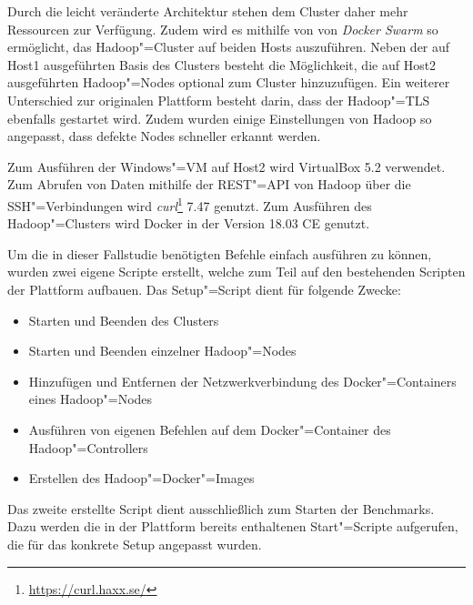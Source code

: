 Durch die leicht veränderte Architektur stehen dem Cluster daher mehr Ressourcen zur Verfügung.
Zudem wird es mithilfe von von \emph{Docker Swarm} so ermöglicht, das Hadoop"=Cluster auf beiden Hosts auszuführen.
Neben der auf Host1 ausgeführten Basis des Clusters besteht die Möglichkeit, die auf Host2 ausgeführten Hadoop"=Nodes optional zum Cluster hinzuzufügen.
Ein weiterer Unterschied zur originalen Plattform besteht darin, dass der Hadoop"=\ac{TLS} ebenfalls gestartet wird.
Zudem wurden einige Einstellungen von Hadoop so angepasst, dass defekte Nodes schneller erkannt werden.

Zum Ausführen der Windows"=VM auf Host2 wird VirtualBox 5.2 verwendet.
Zum Abrufen von Daten mithilfe der REST"=API von Hadoop über die SSH"=Verbindungen wird \emph{curl}\footnote{\url{https://curl.haxx.se/}} 7.47 genutzt.
Zum Ausführen des Hadoop"=Clusters wird Docker in der Version 18.03 CE genutzt.

Um die in dieser Fallstudie benötigten Befehle einfach ausführen zu können, wurden zwei eigene Scripte erstellt, welche zum Teil auf den bestehenden Scripten der Plattform aufbauen.
Das Setup"=Script dient für folgende Zwecke:

\begin{itemize}
    \item Starten und Beenden des Clusters
    \item Starten und Beenden einzelner Hadoop"=Nodes
    \item Hinzufügen und Entfernen der Netzwerkverbindung des Docker"=Containers eines Hadoop"=Nodes
    \item Ausführen von eigenen Befehlen auf dem Docker"=Container des Hadoop"=Controllers
    \item Erstellen des Hadoop"=Docker"=Images
\end{itemize}

Das zweite erstellte Script dient ausschließlich zum Starten der Benchmarks.
Dazu werden die in der Plattform bereits enthaltenen Start"=Scripte aufgerufen, die für das konkrete Setup angepasst wurden.

